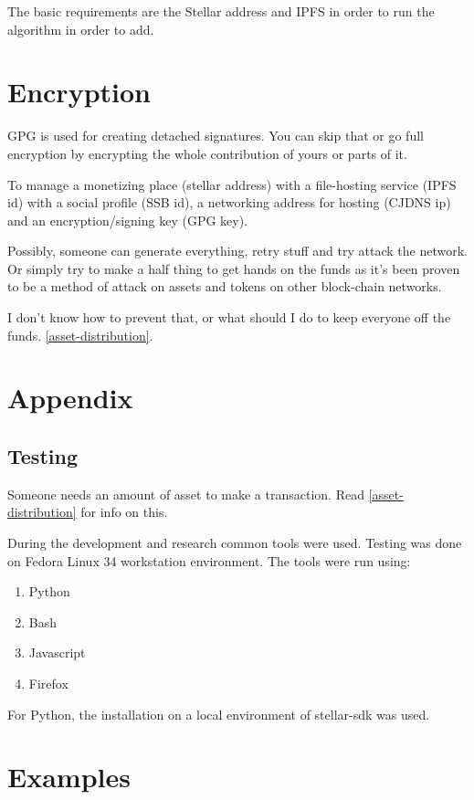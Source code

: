 \documentclass[10pt,a4paper]{paper}
\begin{document}
	The basic requirements are the Stellar address and IPFS in order to run the algorithm in order to add.
	
	\section{Encryption}
	GPG is used for creating detached signatures. You can skip that or go full encryption by encrypting the whole contribution of yours or parts of it.
	
	To manage a monetizing place (stellar address) with a file-hosting service (IPFS id) with a social profile (SSB id), a networking address for hosting (CJDNS ip) and an encryption/signing key (GPG key).

	Possibly, someone can generate everything, retry stuff and try attack the network. Or simply try to make a half thing to get hands on the funds as it's been proven to be a method of attack on assets and tokens on other block-chain networks.

	I don't know how to prevent that, or what should I do to keep everyone off the funds. \ref{asset-distribution}.
\section{Appendix}\label{appendix}
\subsection{Testing}\label{testing}

Someone needs an amount of asset to make a transaction. Read
\ref{asset-distribution} for info on this.

During the development and research common tools were used. Testing was done on Fedora Linux 34 workstation environment. The tools were run using:
\begin{enumerate}
	\item Python
	\item Bash
	\item Javascript
	\item Firefox
\end{enumerate}

For Python, the installation on a local environment of stellar-sdk was used.

\section{Examples}\label{examples}
\end{document}
